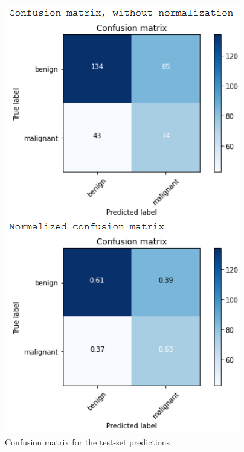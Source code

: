 \documentclass[11pt,a4paper,oneside]{article}
\begin{document}
\begin{figure}[h]
\begin{minipage}[c]{.4\textwidth}
		\label{fig:accuracy_2.2_1_weights}
	\end{minipage}
	\hspace{5mm}%
	\begin{minipage}[c]{.4\textwidth}
		\centering\setlength{\captionmargin}{0pt}%
		\includegraphics[width=.9\textwidth]{images/2.2/7_matrix}
		\caption{Confusion matrix for the test-set predictions}
		\label{fig:matrix_2.2_1_weights}
	\end{minipage}%
\end{figure}
\end{document}
